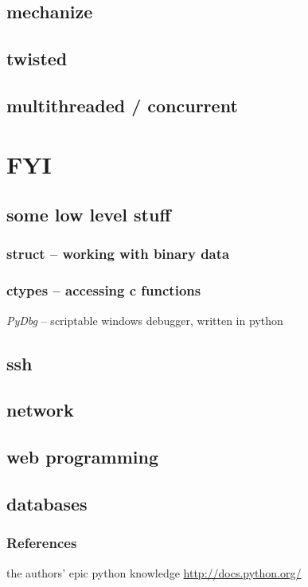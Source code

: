 \documentclass{beamer}
\begin{document}
\subsection*{mechanize} %
\subsection*{twisted}	%
\subsection*{multithreaded / concurrent}	%

\section{FYI}

\subsection*{some low level stuff}	%

\begin{frame}
	\frametitle{struct -- working with binary data}
\end{frame}

\begin{frame}
	\frametitle{ctypes -- accessing c functions}
	\emph{PyDbg} -- scriptable windows debugger, written in python
\end{frame}

\subsection*{ssh}

\subsection*{network}

\subsection*{web programming}

\subsection*{databases}

\begin{frame}
	\frametitle{References}
	\begin{thebibliography}{3}
	 the authors' epic python knowledge
	 \url{http://docs.python.org/}
	\end{thebibliography}
\end{frame}
\end{document}
